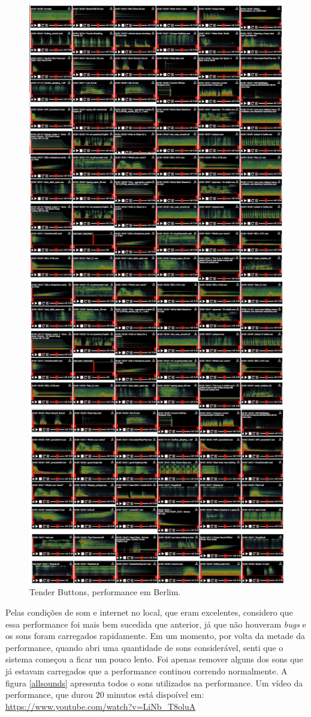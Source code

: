 \begin{figure}
\includegraphics[width=0.8\linewidth]{pictures/cap4/tenderbuttonssounds}
\caption{Tender Buttons, performance em Berlim.}
\label{tenderbuttonsberlim}
\end{figure}


Pelas condições de som e internet no local, que eram excelentes, considero que essa performance foi mais bem sucedida que anterior, já que não houveram \emph{bugs} e os sons foram carregados rapidamente. Em um momento, por volta da metade da performance, quando abri uma quantidade de sons considerável, senti que o sistema começou a ficar um pouco lento. Foi apenas remover alguns dos sons que já estavam carregados que a performance continou correndo normalmente. A figura \ref{allsounds} apresenta todos o sons utilizados na performance. Um vídeo da performance, que durou 20 minutos está dispoível em: \url{https://www.youtube.com/watch?v=LiNb_T8oluA}

